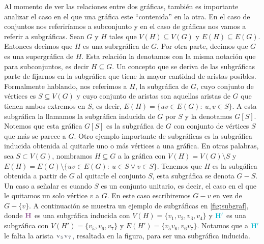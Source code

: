 Al momento de ver las relaciones entre dos gr\'aficas, tambi\'en es importante
analizar el caso en el que una gr\'afica este ``contenida'' en la otra. En el
caso de conjuntos nos referir\'iamos a subconjunto y en el caso de gr\'aficas
nos vamos a referir a subgr\'aficas. Sean $G$ y $H$ tales que $V(H) \subseteq
V(G)$ y $E(H) \subseteq E(G)$. Entonces decimos que $H$ es una subrgr\'afica de
$G$. Por otra parte, decimos que $G$ es una supergr\'afica de $H$. Esta
relaci\'on la denotamos con la misma notaci\'on que para subconjuntos, es decir
$H \subseteq G$. Un concepto que se deriva de las subgr\'aficas parte de
fijarnos en la subgr\'afica que tiene la mayor cantidad de aristas posibles.
Formalmente hablando, nos referimos a $H$, la subgr\'afica de $G$, cuyo conjunto
de v\'ertices es $S \subseteq V(G)$ y cuyo conjunto de aristas son aquellas
aristas de $G$ que tienen ambos extremos en $S$, es decir, $E(H) = \{uv \in E(G)
\colon\ u,v \in S\}$. A esta subgr\'afica la llamamos la subgr\'afica inducida
de $G$ por $S$ y la denotamos $G[S]$. Notemos que esta gr\'afica $G[S]$ es la
subgr\'afica de $G$ con conjunto de v\'ertices $S$ que m\'as se parece a $G$.
Otro ejemplo importante de subgr\'aficas es la subgr\'afica inducida obtenida al
quitarle uno o m\'as v\'ertices a una gr\'afica. En otras palabras, sea $S
\subset V(G)$, nombramos $H \subseteq G$ a la gr\'afica con $V(H)=V(G) \setminus
S$ y $E(H) = E(G)\setminus\{uv \in E(G) \colon\ u \in S \lor v \in S\}$. Tenemos
que $H$ es la subg\'afica obtenida a partir de $G$ al quitarle el conjunto $S$,
esta subgr\'afica se denota $G-S$. Un caso a se\~{n}alar es cuando $S$ es un
conjunto unitario, es decir, el caso en el que le quitamos un solo v\'ertice $v$
a $G$. En este caso escribiremos $G-v$ en vez de $G-\{v\}$. A continuaci\'on se
muestra un ejemplo de subgr\'aficas en \cref{fig:subgraf}, donde
${\color{morado}\bf H}$ es una subgr\'afica inducida con $V(H) =
\{v_1,v_2,v_3,v_4\}$ y ${\color{azulCielo}\bf H'}$ es una subgr\'afica con
$V(H')=\{v_5,v_6,v_7\}$ y $E(H')=\{v_5v_6,  v_6v_7\}$. Notamos que a
${\color{azulCielo}\bf H'}$ le falta la arista ${\color{grisOscuro!80}\bf
v_5v_7}$, resaltada en la figura, para ser una subgr\'afica inducida. 


